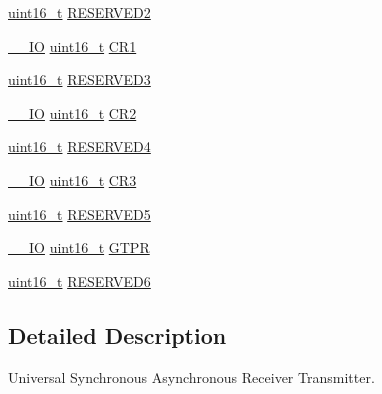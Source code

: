 \begin{DoxyCompactItemize}
\item 
\hyperlink{_p_e___types_8h_a1f1825b69244eb3ad2c7165ddc99c956}{uint16\+\_\+t} \hyperlink{struct_u_s_a_r_t___type_def_af2b7924854e56d0ebd3e8699dfd0e369}{R\+E\+S\+E\+R\+V\+E\+D2}
\item 
\hyperlink{group___c_m_s_i_s___c_m3__core__definitions_gaec43007d9998a0a0e01faede4133d6be}{\+\_\+\+\_\+\+IO} \hyperlink{_p_e___types_8h_a1f1825b69244eb3ad2c7165ddc99c956}{uint16\+\_\+t} \hyperlink{struct_u_s_a_r_t___type_def_a5de50313b1437f7f926093f00902d37a}{C\+R1}
\item 
\hyperlink{_p_e___types_8h_a1f1825b69244eb3ad2c7165ddc99c956}{uint16\+\_\+t} \hyperlink{struct_u_s_a_r_t___type_def_a158066c974911c14efd7ea492ea31137}{R\+E\+S\+E\+R\+V\+E\+D3}
\item 
\hyperlink{group___c_m_s_i_s___c_m3__core__definitions_gaec43007d9998a0a0e01faede4133d6be}{\+\_\+\+\_\+\+IO} \hyperlink{_p_e___types_8h_a1f1825b69244eb3ad2c7165ddc99c956}{uint16\+\_\+t} \hyperlink{struct_u_s_a_r_t___type_def_a2a494156d185762e4596696796c393bc}{C\+R2}
\item 
\hyperlink{_p_e___types_8h_a1f1825b69244eb3ad2c7165ddc99c956}{uint16\+\_\+t} \hyperlink{struct_u_s_a_r_t___type_def_a6ac527c7428ad8807a7740c1f33f0351}{R\+E\+S\+E\+R\+V\+E\+D4}
\item 
\hyperlink{group___c_m_s_i_s___c_m3__core__definitions_gaec43007d9998a0a0e01faede4133d6be}{\+\_\+\+\_\+\+IO} \hyperlink{_p_e___types_8h_a1f1825b69244eb3ad2c7165ddc99c956}{uint16\+\_\+t} \hyperlink{struct_u_s_a_r_t___type_def_a2b9d1df38cb1d745305c8190a8707a0f}{C\+R3}
\item 
\hyperlink{_p_e___types_8h_a1f1825b69244eb3ad2c7165ddc99c956}{uint16\+\_\+t} \hyperlink{struct_u_s_a_r_t___type_def_aa893512291681dfbecc5baa899cfafbf}{R\+E\+S\+E\+R\+V\+E\+D5}
\item 
\hyperlink{group___c_m_s_i_s___c_m3__core__definitions_gaec43007d9998a0a0e01faede4133d6be}{\+\_\+\+\_\+\+IO} \hyperlink{_p_e___types_8h_a1f1825b69244eb3ad2c7165ddc99c956}{uint16\+\_\+t} \hyperlink{struct_u_s_a_r_t___type_def_abe51502097b1fd281d0a2a1b157d769e}{G\+T\+PR}
\item 
\hyperlink{_p_e___types_8h_a1f1825b69244eb3ad2c7165ddc99c956}{uint16\+\_\+t} \hyperlink{struct_u_s_a_r_t___type_def_acd89bb1cba0381c2be8a551e6d14e9f7}{R\+E\+S\+E\+R\+V\+E\+D6}
\end{DoxyCompactItemize}


\subsection{Detailed Description}
Universal Synchronous Asynchronous Receiver Transmitter. 

